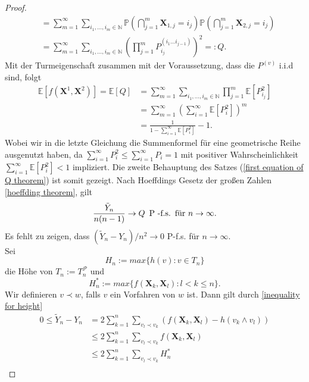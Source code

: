 \begin{proof}
\begin{align}
&=\sum_{m=1}^{\infty}\sum_{i_1,...,i_m \in \mathbb{N}}\mathbb{P}(\bigcap_{j=1}^{m}\textbf{X}_{1,j} = i_j )\mathbb{P}(\bigcap_{j=1}^{m}\textbf{X}_{2,j} = i_j ) \nonumber\\
&=\sum_{m=1}^{\infty}\sum_{i_1,...,i_m \in \mathbb{N}}(\prod_{j=1}^{m}P_{i_j}^{(i_1...i_{j-1})})^2 =: Q.
\end{align}
Mit der Turmeigenschaft zusammen mit der Voraussetzung, dass die $P^{(v)}$ i.i.d sind, folgt 
\begin{align}
\mathbb{E}[f(\textbf{X}^1,\textbf{X}^2) ] = \mathbb{E}[Q] &=\sum_{m=1}^{\infty}\sum_{i_1,...,i_m \in \mathbb{N}}\prod_{j=1}^{m}\mathbb{E}[P_{i_j}^{2}] \nonumber\\
 &= \sum_{m=1}^{\infty}(\sum_{i =1}^{\infty}\mathbb{E}[P_{i}^{2}])^m \nonumber \\
 &= \frac{1}{1- \sum_{i=1}^{\infty}\mathbb{E}[P_i^2]}-1 \nonumber.
\end{align}
Wobei wir in die letzte Gleichung die Summenformel für eine geometrische Reihe ausgenutzt haben, da $\sum_{i=1}^{\infty} P_i^2 \leq \sum_{i=1}^{\infty} P_i = 1$ mit positiver Wahrscheinlichkeit $\sum_{i=1}^{\infty} \mathbb{E}[P_i^2] < 1$ impliziert. Die zweite Behauptung des Satzes (\ref{first equation of Q theorem}) ist somit gezeigt.
Nach Hoeffdings Gesetz der großen Zahlen \ref{hoeffding theorem}, gilt
\[
    \frac{\tilde{Y}_n}{n(n-1)} \rightarrow Q \hspace{5pt} \textnormal{P -f.s.} \hspace{5pt} \textnormal{für } n \to \infty.
\]
Es fehlt zu zeigen, dass $(\tilde{Y}_n-Y_n)/n^2 \rightarrow 0 $ P-f.s. für $n \to \infty$. \\
Sei 
\begin{equation}
H_n := max\{h(v) : v \in T_n\}
\end{equation}
die Höhe von $T_n := T_n^\mathcal{P}$ und
\begin{equation}
H^*_n := max\{f(\textbf{X}_k,\textbf{X}_l) : l < k \leq n\}.
\end{equation}
Wir definieren $v \prec w$, falls $v$ ein Vorfahren von $w$ ist. Dann gilt durch \ref{inequality for height}
\begin{align*}
    0 \leq \tilde{Y}_n - Y_n &= 2\sum_{k=1}^{n}\sum_{v_l \prec v_k}(f(\textbf{X}_k,\textbf{X}_l)-h(v_k \wedge v_l))\\
    &\leq 2\sum_{k=1}^{n}\sum_{v_l \prec v_k}f(\textbf{X}_k,\textbf{X}_l) \\
    &\leq 2\sum_{k=1}^{n}\sum_{v_l \prec v_k}H_n^* \\

\end{align*}
\end{proof}
